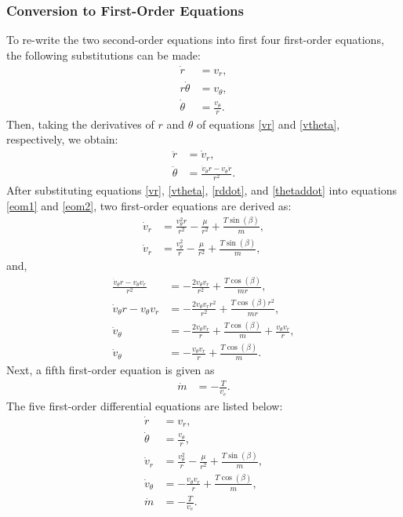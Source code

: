 \documentclass[]{article}
\begin{document}
	\subsubsection{Conversion to First-Order Equations}
	To re-write the two second-order equations into first four first-order equations, the following substitutions can be made:
	\begin{align}
		\dot{r}       &= v_r,     \label{vr} \\
		r\dot{\theta} &= v_\theta,  \nonumber \\
		\dot{\theta}  &= \frac{v_\theta}{r}. \label{vtheta}
	\end{align}
	Then, taking the derivatives of \(r\) and \(\theta\) of equations \ref{vr} and \ref{vtheta}, respectively, we obtain:
	\begin{align}
		\ddot{r}      &= \dot{v}_r,  \label{rddot} \\
		\ddot{\theta} &= \frac{\dot{v}_{\theta}r - v_{\theta}\dot{r}}{r^2}. \label{thetaddot}
	\end{align}
	After substituting equations \ref{vr}, \ref{vtheta}, \ref{rddot}, and \ref{thetaddot} into equations \ref{eom1} and \ref{eom2}, two first-order equations are derived as:
	\begin{align}
		\dot{v}_r     &= \frac{v^2_{\theta}r}{r^2} - \frac{\mu}{r^2} + \frac{T\sin(\beta)}{m},                      \nonumber \\
		\dot{v}_r     &= \frac{v^2_{\theta}}{r} - \frac{\mu}{r^2} + \frac{T\sin(\beta)}{m},                        \label{vrdot}
	\end{align}
	and,
	\begin{align}
		\frac{\dot{v}_{\theta}r - v_{\theta}v_r}{r^2} &= -\frac{2v_{\theta}v_r}{r^2}   + \frac{T\cos(\beta)}{mr},   \nonumber\\
		\dot{v}_{\theta}r - v_{\theta}v_r &= -\frac{2v_{\theta}v_{r}r^2}{r^2}   + \frac{T\cos(\beta)r^2}{mr},       \nonumber\\
		\dot{v}_\theta &= -\frac{2v_{\theta}v_{r}}{r}   + \frac{T\cos(\beta)}{m} + \frac{v_{\theta}v_r}{r},        \nonumber\\
		\dot{v}_\theta &= -\frac{v_{\theta}v_{r}}{r}   + \frac{T\cos(\beta)}{m} \label{vthetadot}.
	\end{align}
	Next, a fifth first-order equation is given as
	\begin{align}
		\dot{m} &= -\frac{T}{v_e}. \label{massflowrate}
	\end{align}
	The five first-order differential equations are listed below:
	\begin{align*}
		\dot{r}       &= v_r,     \\
		\dot{\theta}  &= \frac{v_\theta}{r},  \\ 
	    \dot{v}_r     &= \frac{v^2_{\theta}}{r} - \frac{\mu}{r^2} + \frac{T\sin(\beta)}{m},       \\
		\dot{v}_\theta &= -\frac{v_{\theta}v_{r}}{r}   + \frac{T\cos(\beta)}{m}, \\
		\dot{m} &= -\frac{T}{v_e}.
	\end{align*}
\end{document}
